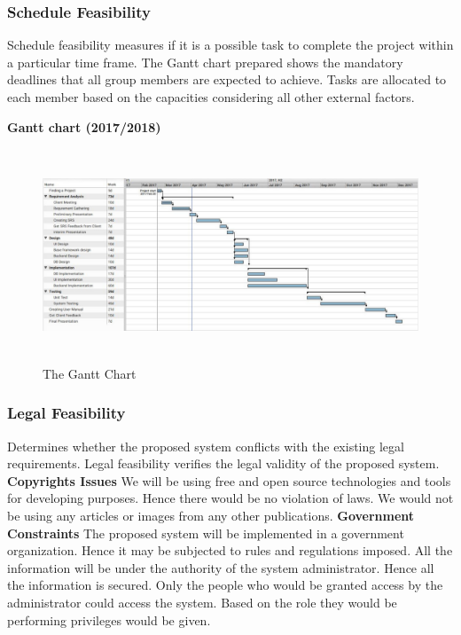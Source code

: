 \documentclass[a4paper,beamer]{article}
\begin{document}
	\subsubsection{Schedule Feasibility}
	Schedule feasibility measures if it is a possible task to complete the project within a particular time frame.\newline
	The Gantt chart prepared shows the mandatory deadlines that all group members are expected to achieve. Tasks are allocated to each member based on the capacities considering all other external factors. \newline

	\vspace{1cm}
	\noindent\textbf{Gantt chart (2017/2018)}
	\begin{figure}[h]
		\begin{center}
			\includegraphics[width=6in,height=2.5in]{img/grantt}
		\end{center}
		\caption{The Gantt Chart}
		\label{fig:gantt}
	\end{figure}
	\newpage

	\subsubsection{Legal Feasibility}
	Determines whether the proposed system conflicts with the existing legal requirements. Legal feasibility verifies the legal validity of the proposed system.\newline
	\newline
	\textbf{Copyrights Issues}\newline
	We will be using free and open source technologies and tools for developing purposes. Hence there would be no violation of laws. We would not be using any articles or images from any other publications.\newline
	\newline
	\textbf{Government Constraints}\newline
	The proposed system will be implemented in a government organization. Hence it may be subjected to rules and regulations imposed.\newline
	All the information will be under the authority of the system administrator. Hence all the information is secured. Only the people who would be granted access by the administrator could access the system. Based on the role they would be performing privileges would be given.\newline
	
\end{document}
